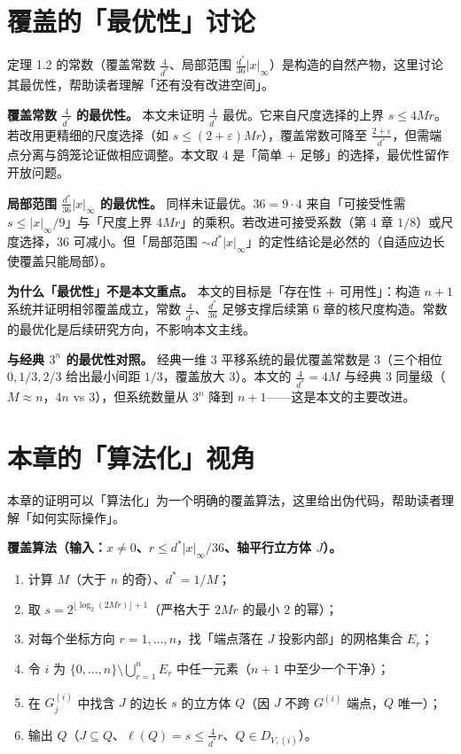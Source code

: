 \documentclass[a4paper,11pt,openany]{ctexbook}
\numberwithin{equation}{chapter}
\numberwithin{figure}{chapter}
\numberwithin{table}{chapter}
\begin{document}
\section{覆盖的「最优性」讨论}

定理 1.2 的常数（覆盖常数 $\frac4{d^*}$、局部范围 $\frac{d^*}{36}|x|_\infty$）是构造的自然产物，这里讨论其最优性，帮助读者理解「还有没有改进空间」。

\textbf{覆盖常数 $\frac4{d^*}$ 的最优性。} 本文未证明 $\frac4{d^*}$ 最优。它来自尺度选择的上界 $s\le4Mr$。若改用更精细的尺度选择（如 $s\le(2+\varepsilon)Mr$），覆盖常数可降至 $\frac{2+\varepsilon}{d^*}$，但需端点分离与鸽笼论证做相应调整。本文取 $4$ 是「简单 + 足够」的选择，最优性留作开放问题。

\textbf{局部范围 $\frac{d^*}{36}|x|_\infty$ 的最优性。} 同样未证最优。$36=9\cdot4$ 来自「可接受性需 $s\le|x|_\infty/9$」与「尺度上界 $4Mr$」的乘积。若改进可接受系数（第 4 章 $1/8$）或尺度选择，$36$ 可减小。但「局部范围 $\sim d^*|x|_\infty$」的定性结论是必然的（自适应边长使覆盖只能局部）。

\textbf{为什么「最优性」不是本文重点。} 本文的目标是「存在性 + 可用性」：构造 $n+1$ 系统并证明相邻覆盖成立，常数 $\frac4{d^*}$、$\frac{d^*}{36}$ 足够支撑后续第 6 章的核尺度构造。常数的最优化是后续研究方向，不影响本文主线。

\textbf{与经典 $3^n$ 的最优性对照。} 经典一维 $3$ 平移系统的最优覆盖常数是 $3$（三个相位 $0,1/3,2/3$ 给出最小间距 $1/3$，覆盖放大 $3$）。本文的 $\frac4{d^*}=4M$ 与经典 $3$ 同量级（$M\approx n$，$4n$ vs $3$），但系统数量从 $3^n$ 降到 $n+1$——这是本文的主要改进。

\section{本章的「算法化」视角}

本章的证明可以「算法化」为一个明确的覆盖算法，这里给出伪代码，帮助读者理解「如何实际操作」。

\textbf{覆盖算法（输入：$x\neq0$、$r\le d^*|x|_\infty/36$、轴平行立方体 $J$）。}

\begin{enumerate}
\item 计算 $M$（大于 $n$ 的奇）、$d^*=1/M$；
\item 取 $s=2^{\lfloor\log_2(2Mr)\rfloor+1}$（严格大于 $2Mr$ 的最小 $2$ 的幂）；
\item 对每个坐标方向 $r=1,\dots,n$，找「端点落在 $J$ 投影内部」的网格集合 $E_r$；
\item 令 $i$ 为 $\{0,\dots,n\}\setminus\bigcup_{r=1}^nE_r$ 中任一元素（$n+1$ 中至少一个干净）；
\item 在 $G_j^{(i)}$ 中找含 $J$ 的边长 $s$ 的立方体 $Q$（因 $J$ 不跨 $G^{(i)}$ 端点，$Q$ 唯一）；
\item 输出 $Q$（$J\subseteq Q$、$\ell(Q)=s\le\frac4{d^*}r$、$Q\in D_{V,(i)}$）。
\end{enumerate}
\end{document}
